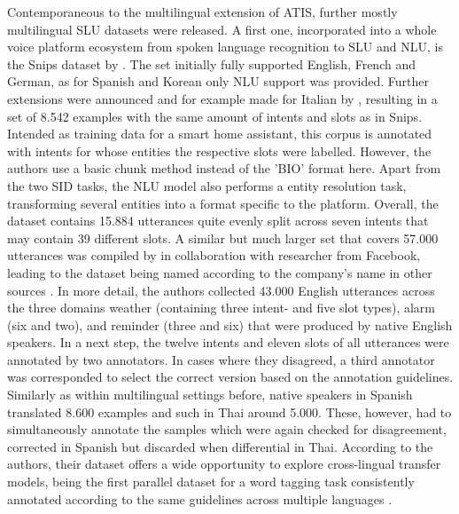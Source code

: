 \documentclass[11pt,a4paper,twoside,openright]{scrbook}
\begin{document}
Contemporaneous to the multilingual extension of ATIS, further mostly multilingual SLU datasets were released. A first one, incorporated into a whole voice platform ecosystem from spoken language recognition to SLU and NLU, is the Snips dataset by \citet{coucke2018snips}. The set initially fully supported English, French and German, as for Spanish and Korean only NLU support was provided. Further extensions were announced and for example made for Italian by \citet{bellomaria2019almawaveslu}, resulting in a set of 8.542 examples with the same amount of intents and slots as in Snips. Intended as training data for a smart home assistant, this corpus is annotated with intents for whose entities the respective slots were labelled. However, the authors use a basic chunk method instead of the 'BIO' format here. Apart from the two SID tasks, the NLU model also performs a entity resolution task, transforming several entities into a format specific to the platform. Overall, the dataset contains 15.884 utterances quite evenly split across seven intents that may contain 39 different slots. A similar but much larger set that covers 57.000 utterances was compiled by \citet{schuster-etal-2019-cross-lingual} in collaboration with researcher from Facebook, leading to the dataset being named according to the company's name in other sources \citep{2023-findings-vardial}. In more detail, the authors collected 43.000 English utterances across the three domains weather (containing three intent- and five slot types), alarm (six and two), and reminder (three and six) that were produced by native English speakers. In a next step, the twelve intents and eleven slots of all utterances were annotated by two annotators. In cases where they disagreed, a third annotator was corresponded to select the correct version based on the annotation guidelines. Similarly as within multilingual settings before, native speakers in Spanish translated 8.600 examples and such in Thai around 5.000. These, however, had to simultaneously annotate the samples which were again checked for disagreement, corrected in Spanish but discarded when differential in Thai. According to the authors, their dataset offers a wide opportunity to explore cross-lingual transfer models, being the first parallel dataset for a word tagging task consistently annotated according to the same guidelines across multiple languages \citep{schuster-etal-2019-cross-lingual}.
\end{document}
